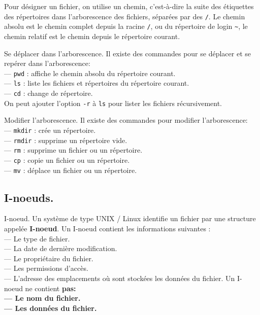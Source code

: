 \documentclass[french, 11pt]{article}
\begin{document}
\begin{defi}{}{}
    Pour désigner un fichier, on utilise un chemin, c'est-à-dire la suite des étiquettes des répertoires dans l'arborescence des fichiers, séparées par des \texttt{/}.\n
    Le chemin absolu est le chemin complet depuis la racine \texttt{/}, ou du répertoire de login \texttt{\textasciitilde}, le chemin relatif est le chemin depuis le répertoire courant.
\end{defi}

\begin{defi}{Se déplacer dans l'arborescence.}{}
   Il existe des commandes pour se déplacer et se repérer dans l'arborescence:\\
    --- \texttt{pwd} : affiche le chemin absolu du répertoire courant.\\
    --- \texttt{ls} : liste les fichiers et répertoires du répertoire courant.\\
    --- \texttt{cd} : change de répertoire.\\
    On peut ajouter l'option \texttt{-r} à \texttt{ls} pour lister les fichiers récursivement.
\end{defi}

\begin{defi}{Modifier l'arborescence.}{}
    Il existe des commandes pour modifier l'arborescence:\\
    --- \texttt{mkdir} : crée un répertoire.\\
    --- \texttt{rmdir} : supprime un répertoire vide.\\
    --- \texttt{rm} : supprime un fichier ou un répertoire.\\
    --- \texttt{cp} : copie un fichier ou un répertoire.\\
    --- \texttt{mv} : déplace un fichier ou un répertoire.
\end{defi}

\subsection{I-noeuds.}

\begin{defi}{I-noeud.}{}
    Un système de type UNIX / Linux identifie un fichier par une structure appelée \textbf{I-noeud}.\n
    Un I-noeud contient les informations suivantes :\\
    --- Le type de fichier.\\
    --- La date de dernière modification.\\
    --- Le propriétaire du fichier.\\
    --- Les permissions d'accès.\\
    --- L'adresse des emplacements où sont stockées les données du fichier.\n
    Un I-noeud ne contient \bf{pas}:\\
    --- Le nom du fichier.\\
    --- Les données du fichier.
\end{defi}
\end{document}

